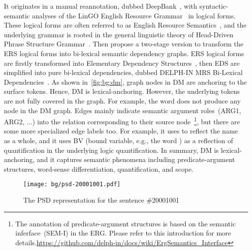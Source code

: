 It originates in a manual reannotation, dubbed
DeepBank~\citep{Fli:Kor:Zha:12}, with syntactic-semantic analyses of
the LinGO English Resource Grammar~\citep{Oep:Fli:Tou:04} in logical
forms. These logical forms are often referred to as English Resource
Semantics~\citep[ERS,][]{Ben:Fli:Oep:15}, and the underlying grammar
is rooted in the general linguistic theory of Head-Driven Phrase
Structure Grammar~\citep[HPSG,][]{Pol:Sag:94}. Then
\citet{Iva:Oep:Ovr:12} propose a two-stage version to transform the
ERS logical forms into bi-lexical semantic dependency graphs. ERS
logical forms are firstly transformed into Elementary Dependency
Structures~\citep[EDS,][]{Oep:Lon:06}, then EDS are simplified into
pure bi-lexical dependencies, dubbed DELPH-IN MRS Bi-Lexical
Dependencies~\citep[DM,][]{Iva:Oep:Ovr:12}. As shown
in~\autoref{fig:bg:dm}, graph nodes in DM are anchoring to the surface
tokens. Hence, DM is lexical-anchoring. However, the underlying tokens
are not fully covered in the graph. For example, the word
 does not produce any node in the DM graph. Edges mainly
indicate semantic argument roles~(ARG1, ARG2, ...) into the relation
corresponding to their source node~\footnote{The annotation of
  predicate-argument structures is based on the semantic
  inferface~(SEM-I) in the ERG. Please refer to this introduction for
  more
  details.\url{https://github.com/delph-in/docs/wiki/ErgSemantics_Interface}},
but there are some more specialized edge labels too. For example, it
uses  to reflect the name~ as a
whole, and it uses BV (bound variable, e.g., the word ) as
a reflection of quantification in the underlying logic
quantification. In summary, DM is lexical-anchoring, and it captures
semantic phenomena including predicate-argument structures, word-sense
differentiation, quantification, and scope.

\begin{figure}[!tbp]
\centering
\texttt{[image: bg/psd-20001001.pdf]}
\caption{\label{fig:bg:psd}The PSD representation for the sentence
  \#20001001}
\end{figure}

